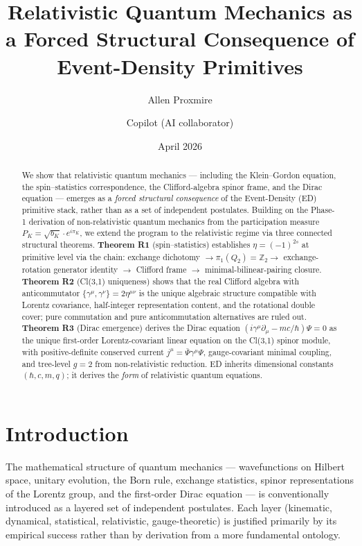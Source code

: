 \documentclass[11pt,a4paper]{article}
\title{Relativistic Quantum Mechanics as a Forced Structural Consequence of Event-Density Primitives}
\author{Allen Proxmire \and Copilot (AI collaborator)}
\date{April 2026}
\begin{document}
\maketitle

\begin{abstract}
We show that relativistic quantum mechanics --- including the Klein--Gordon equation, the spin--statistics correspondence, the Clifford-algebra spinor frame, and the Dirac equation --- emerges as a \emph{forced structural consequence} of the Event-Density (ED) primitive stack, rather than as a set of independent postulates. Building on the Phase-1 derivation of non-relativistic quantum mechanics from the participation measure $P_K = \sqrt{b_K} \cdot e^{i\pi_K}$, we extend the program to the relativistic regime via three connected structural theorems. \textbf{Theorem R1} (spin--statistics) establishes $\eta = (-1)^{2s}$ at primitive level via the chain: exchange dichotomy $\to \pi_1(Q_2) = \mathbb{Z}_2 \to$ exchange-rotation generator identity $\to$ Clifford frame $\to$ minimal-bilinear-pairing closure. \textbf{Theorem R2} (Cl(3,1) uniqueness) shows that the real Clifford algebra with anticommutator $\{\gamma^\mu, \gamma^\nu\} = 2\eta^{\mu\nu}$ is the unique algebraic structure compatible with Lorentz covariance, half-integer representation content, and the rotational double cover; pure commutation and pure anticommutation alternatives are ruled out. \textbf{Theorem R3} (Dirac emergence) derives the Dirac equation $(i\gamma^\mu \partial_\mu - mc/\hbar)\Psi = 0$ as the unique first-order Lorentz-covariant linear equation on the Cl(3,1) spinor module, with positive-definite conserved current $j^\mu = \bar\Psi\gamma^\mu\Psi$, gauge-covariant minimal coupling, and tree-level $g = 2$ from non-relativistic reduction. ED inherits dimensional constants $(\hbar, c, m, q)$; it derives the \emph{form} of relativistic quantum equations.
\end{abstract}

\section{Introduction}

The mathematical structure of quantum mechanics --- wavefunctions on Hilbert space, unitary evolution, the Born rule, exchange statistics, spinor representations of the Lorentz group, and the first-order Dirac equation --- is conventionally introduced as a layered set of independent postulates. Each layer (kinematic, dynamical, statistical, relativistic, gauge-theoretic) is justified primarily by its empirical success rather than by derivation from a more fundamental ontology.
\end{document}
